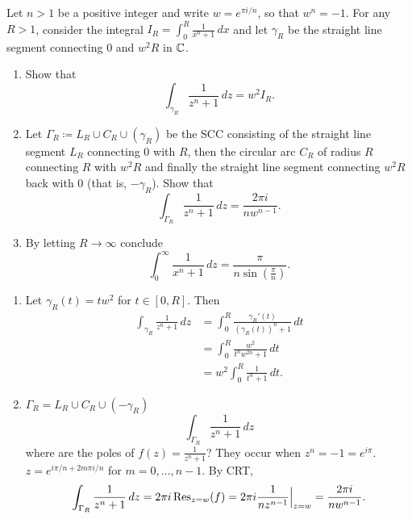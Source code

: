 \documentclass[10pt, a4paper]{article}
\begin{document}
\begin{problem}
    Let $n > 1$ be a positive integer and write $w = e ^ {\pi i / n}$,
    so that $w ^ n = -1$.
    For any $R > 1$,
    consider the integral $\displaystyle I_R = \int_{0}^{R}\frac{1}{x ^ n + 1}\,dx$ and let $\gamma_{R}$ be the straight line segment connecting $0$ and $w ^ 2R$ in $\mathbb{C}$.

    \begin{enumerate}[label = (\roman*)]
        \item Show that
        \[
        \int_{\gamma_R}\frac{1}{z ^ n + 1}\,dz = w ^ 2I_R.
        \]

        \item Let $\Gamma_R \coloneqq L_R \cup C_R \cup (\gamma_R)$ be the SCC consisting of the straight line segment $L_R$ connecting $0$ with $R$,
        then the circular arc $C_R$ of radius $R$ connecting $R$ with $w ^ 2R$ and finally the straight line segment connecting $w ^ 2R$ back with $0$
        (that is,
        $-\gamma_R$).
        Show that
        \[
        \int_{\Gamma_R}\frac{1}{z ^ n + 1}\,dz = \frac{2\pi i}{nw ^ {n - 1}}.
        \]

        \item By letting $R \to \infty$ conclude
        \[
        \int_{0}^{\infty}\frac{1}{x ^ n + 1}\,dz = \frac{\pi}{n\sin\left(\frac{\pi}{n}\right)}.
        \]
    \end{enumerate}

    \begin{solution}\phantom{}
        \begin{enumerate}[label = (\roman*)]
            \item Let $\gamma_R(t) = tw ^ 2$ for $t \in [0, R]$.
            Then
            \begin{align*}
                \int_{\gamma_R}\frac{1}{z ^ n + 1}\,dz &= \int_{0}^{R}\frac{\gamma_R'(t)}{(\gamma_R(t)) ^ n + 1}\,dt \\
                &= \int_{0}^{R}\frac{w ^ 2}{t ^ nw ^ {2n} + 1}\,dt \\
                &= w ^ 2\int_{0}^{R}\frac{1}{t ^ n + 1}\,dt.
            \end{align*}

            \item $\Gamma_{R} = L_R \cup C_R \cup (-\gamma_{R})$
            \[
            \int_{\Gamma_{R}}\frac{1}{z ^ n + 1}\,dz
            \]
            where are the poles of $f(z) = \frac{1}{z ^ n + 1}$?
            They occur when $z ^ n = -1 = e ^ {i\pi}$.
            $z = e ^ {i\pi / n + 2m\pi i / n}$ for $m = 0, \dotsc, n - 1$.
            By CRT,
            \[
            \int_{\Gamma_{R}}\frac{1}{z ^ n + 1}\,dz = 2\pi i\operatorname{Res}_{z = w}(f) = 2\pi i\frac{1}{nz ^ {n - 1}}\Big|_{z = w} = \frac{2\pi i}{nw ^ {n - 1}}.
            \]


\end{enumerate}
\end{solution}
\end{problem}
\end{document}
